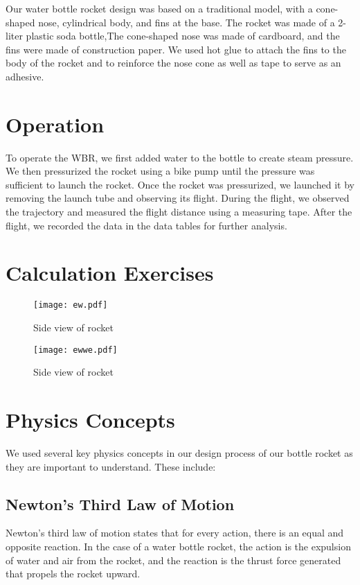 \documentclass[11pt]{article}
\begin{document}
Our water bottle rocket design was based on a traditional model, with a cone-shaped nose, cylindrical body, and fins at the base. The rocket was made of a 2-liter plastic soda bottle,The cone-shaped nose was made of cardboard, and the fins were made of construction paper. We used hot glue to attach the fins to the body of the rocket and to reinforce the nose cone as well as tape to serve as an adhesive.

\section{Operation}

To operate the WBR, we first added water to the bottle to create steam pressure. We then pressurized the rocket using a bike pump until the pressure was sufficient to launch the rocket. Once the rocket was pressurized, we launched it by removing the launch tube and observing its flight. During the flight, we observed the trajectory and measured the flight distance using a measuring tape. After the flight, we recorded the data in the data tables for further analysis.

\section{Calculation Exercises}

\begin{figure}[H]
\centering
\texttt{[image: ew.pdf]}
\caption{Side view of rocket}
\label{fig:technical_sketch}
\end{figure}

\begin{figure}[H]
\centering
\texttt{[image: ewwe.pdf]}
\caption{Side view of rocket}
\label{fig:technical_sketch}
\end{figure}

\section{Physics Concepts}

We used several key physics concepts in our design process of our bottle rocket as they are important to understand. 
These include:

\subsection{Newton's Third Law of Motion}

Newton's third law of motion states that for every action, there is an equal and opposite reaction. In the case of a water bottle rocket, the action is the expulsion of water and air from the rocket, and the reaction is the thrust force generated that propels the rocket upward.
\end{document}
